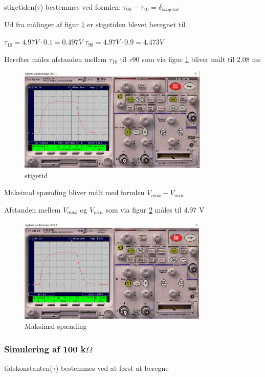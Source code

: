 stigetiden($\tau$) bestemmes ved formlen:
$\tau_{90} - \tau_{10} = \delta_{stigetid}$

Ud fra målinger af figur \ref{10k.50Hz.stigetid}
er stigetiden blevet beregnet til

$\tau_{10} = 4.97 V \cdot 0.1 = 0.497 V$
$\tau_{90} = 4.97 V \cdot 0.9 = 4.473 V$

Herefter måles afstanden mellem $\tau_{10}$ til $\tau{90}$ som via figur \ref{10k.50Hz.stigetid} bliver målt til 2.08 ms

\begin{figure}[h]
 \begin{center}
  \includegraphics[height=5cm]{P_Fig/figur4_10k_50Hz_stigetid.png}
  \caption{stigetid}
  \label{10k.50Hz.stigetid}
 \end{center}
\end{figure}

Maksimal spænding bliver målt med formlen
$V_{max} - V_{min}$

Afstanden mellem $V_{max}$ og $V_{min}$ som via figur \ref{10k.50Hz.min.max} måles til 4.97 V

\begin{figure}[h]
 \begin{center}
  \includegraphics[height=5cm]{P_Fig/figur2_10k_50Hz_min_max.png}
  \caption{Maksimal spænding}
  \label{10k.50Hz.min.max}
 \end{center}
\end{figure}


\subsubsection{Simulering af 100 k$\Omega$ }
tidskonstanten($\tau$) bestemmes ved at først at beregne 

